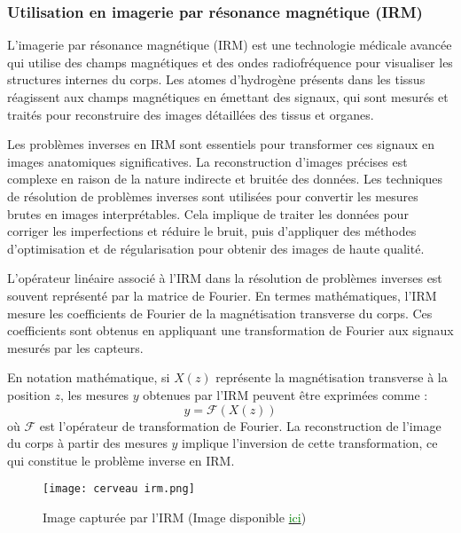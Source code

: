\documentclass[a4paper, 12pt]{report} %
\begin{document}
\subsubsection{Utilisation en imagerie par résonance magnétique (IRM) }

L'imagerie par résonance magnétique (IRM) est une technologie médicale avancée qui utilise des champs magnétiques et des ondes radiofréquence pour visualiser les structures internes du corps. Les atomes d'hydrogène présents dans les tissus réagissent aux champs magnétiques en émettant des signaux, qui sont mesurés et traités pour reconstruire des images détaillées des tissus et organes.

Les problèmes inverses en IRM sont essentiels pour transformer ces signaux en images anatomiques significatives. La reconstruction d'images précises est complexe en raison de la nature indirecte et bruitée des données. Les techniques de résolution de problèmes inverses sont utilisées pour convertir les mesures brutes en images interprétables. Cela implique de traiter les données pour corriger les imperfections et réduire le bruit, puis d'appliquer des méthodes d'optimisation et de régularisation pour obtenir des images de haute qualité.

L'opérateur linéaire associé à l'IRM dans la résolution de problèmes inverses est souvent représenté par la matrice de Fourier. En termes mathématiques, l'IRM mesure les coefficients de Fourier de la magnétisation transverse du corps. Ces coefficients sont obtenus en appliquant une transformation de Fourier aux signaux mesurés par les capteurs.

En notation mathématique, si \( X(z) \) représente la magnétisation transverse à la position \( z \), les mesures \( y \) obtenues par l'IRM peuvent être exprimées comme :
\[
y = \mathcal{F}(X(z))
\]
où \( \mathcal{F} \) est l'opérateur de transformation de Fourier. La reconstruction de l'image du corps à partir des mesures \( y \) implique l'inversion de cette transformation, ce qui constitue le problème inverse en IRM.


\begin{figure}[H] %
    \begin{center}
    \texttt{[image: cerveau irm.png]}
    \caption{Image capturée par l'IRM (Image disponible \href{https://www.lesnumeriques.com/sante-sport/des-images-inedites-du-cerveau-humain-ont-ete-capturees-par-le-plus-puissant-irm-au-monde-n220416.html}{\textcolor{green}{ici}})}
    \label{fig:mon_label}
    \end{center}
\end{figure}
\end{document}
